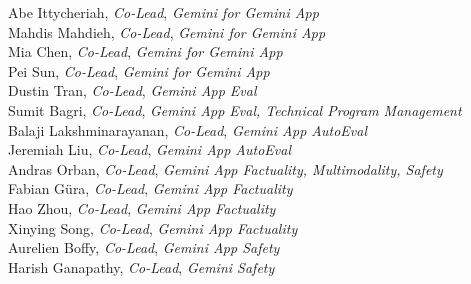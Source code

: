 \begin{minipage}[t]{0.50\linewidth}
Abe Ittycheriah, \textit{Co-Lead}, \textit{Gemini for Gemini App} \\
Mahdis Mahdieh, \textit{Co-Lead}, \textit{Gemini for Gemini App} \\
Mia Chen, \textit{Co-Lead}, \textit{Gemini for Gemini App} \\
Pei Sun, \textit{Co-Lead}, \textit{Gemini for Gemini App} \\
Dustin Tran, \textit{Co-Lead}, \textit{Gemini App Eval} \\
Sumit Bagri, \textit{Co-Lead}, \textit{Gemini App Eval, Technical Program Management} \\
Balaji Lakshminarayanan, \textit{Co-Lead}, \textit{Gemini App AutoEval} \\
Jeremiah Liu, \textit{Co-Lead}, \textit{Gemini App AutoEval} \\
Andras Orban, \textit{Co-Lead}, \textit{Gemini App Factuality, Multimodality, Safety} \\
Fabian Güra, \textit{Co-Lead}, \textit{Gemini App Factuality} \\
Hao Zhou, \textit{Co-Lead}, \textit{Gemini App Factuality} \\
Xinying Song, \textit{Co-Lead}, \textit{Gemini App Factuality} \\
Aurelien Boffy, \textit{Co-Lead}, \textit{Gemini App Safety} \\
Harish Ganapathy, \textit{Co-Lead}, \textit{Gemini Safety} \\

\end{minipage}
